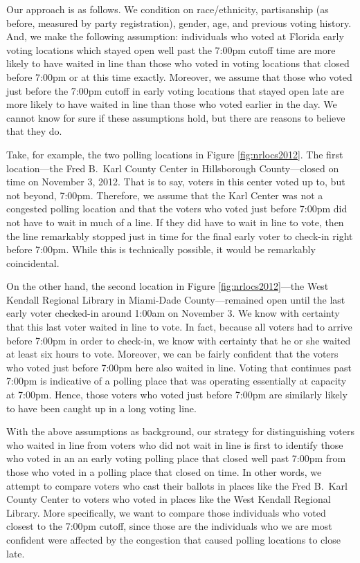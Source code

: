 \documentclass[12pt,titlepage]{article}
\begin{document}
Our approach is as follows.  We condition on race/ethnicity,
partisanship (as before, measured by party registration), gender, age,
and previous voting history.  And, we make the following assumption:
individuals who voted at Florida early voting locations which stayed
open well past the 7:00pm cutoff time are more likely to have waited
in line than those who voted in voting locations that closed before
7:00pm or at this time exactly.  Moreover, we assume that those who
voted just before the 7:00pm cutoff in early voting locations that
stayed open late are more likely to have waited in line than those who
voted earlier in the day.  We cannot know for sure if these
assumptions hold, but there are reasons to believe that they do.

Take, for example, the two polling locations in Figure
\ref{fig:nrlocs2012}.  The first location---the Fred B.\ Karl County
Center in Hillsborough County---closed on time on November 3,
2012. That is to say, voters in this center voted up to, but not
beyond, 7:00pm.  Therefore, we assume that the Karl Center was not a
congested polling location and that the voters who voted just before
7:00pm did not have to wait in much of a line.  If they did have to
wait in line to vote, then the line remarkably stopped just in time
for the final early voter to check-in right before 7:00pm.  While this
is technically possible, it would be remarkably coincidental.

On the other hand, the second location in Figure
\ref{fig:nrlocs2012}---the West Kendall Regional Library in Miami-Dade
County---remained open until the last early voter checked-in around
1:00am on November 3.  We know with certainty that this last voter
waited in line to vote.  In fact, because all voters had to arrive
before 7:00pm in order to check-in, we know with certainty that he or
she waited at least six hours to vote.  Moreover, we can be fairly
confident that the voters who voted just before 7:00pm here also
waited in line.  Voting that continues past 7:00pm is indicative of a
polling place that was operating essentially at capacity at 7:00pm.
Hence, those voters who voted just before 7:00pm are similarly likely
to have been caught up in a long voting line.

With the above assumptions as background, our strategy for
distinguishing voters who waited in line from voters who did not wait
in line is first to identify those who voted in an an early voting
polling place that closed well past 7:00pm from those who voted in a
polling place that closed on time.  In other words, we attempt to
compare voters who cast their ballots in places like the Fred B.\ Karl
County Center to voters who voted in places like the West Kendall
Regional Library.  More specifically, we want to compare those
individuals who voted closest to the 7:00pm cutoff, since those are
the individuals who we are most confident were affected by the
congestion that caused polling locations to close late.
 
\end{document}
